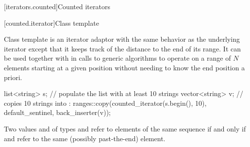[iterators.counted]{Counted iterators}

[counted.iterator]{Class template }

\pnum
Class template  is an iterator adaptor
with the same behavior as the underlying iterator except that
it keeps track of the distance to the end of its range.
It can be used together with 
in calls to generic algorithms to operate on
a range of $N$ elements starting at a given position
without needing to know the end position a priori.

\pnum
\begin{example}
\begin{codeblock}
list<string> s;
// populate the list  with at least 10 strings
vector<string> v;
// copies 10 strings into :
ranges::copy(counted_iterator(s.begin(), 10), default_sentinel, back_inserter(v));
\end{codeblock}
\end{example}

\pnum
Two values  and  of types
and
refer to elements of the same sequence if and only if
and
refer to the same (possibly past-the-end) element.

